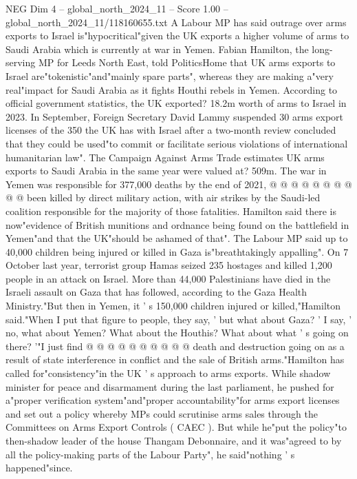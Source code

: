\begin{textsample}{NEG Dim 4 – global\_north\_2024\_11 – Score 1.00 – global\_north\_2024\_11/118160655.txt}  \label{ex:f4_neg_166}
A Labour MP has said outrage over arms exports to Israel is"hypocritical"given the UK exports a higher volume of arms to Saudi Arabia which is currently at war in Yemen.
Fabian Hamilton, the long-serving MP for Leeds North East, told PoliticsHome that UK arms exports to Israel are"tokenistic"and"mainly spare parts", whereas they are making a"very real"impact for Saudi Arabia as it fights Houthi rebels in Yemen.
According to official government statistics, the UK exported? 18.2m worth of arms to Israel in 2023.
In September, Foreign Secretary David Lammy suspended 30 arms export licenses of the 350 the UK has with Israel after a two-month review concluded that they could be used"to commit or facilitate serious violations of international humanitarian law".
The Campaign Against Arms Trade estimates UK arms exports to Saudi Arabia in the same year were valued at? 509m.
The war in Yemen was responsible for 377,000 deaths by the end of 2021, @ @ @ @ @ @ @ @ @ @ been killed by direct military action, with air strikes by the Saudi-led coalition responsible for the majority of those fatalities.
Hamilton said there is now"evidence of British munitions and ordnance being found on the battlefield in Yemen"and that the UK"should be ashamed of that".
The Labour MP said up to 40,000 children being injured or killed in Gaza is"breathtakingly appalling".
On 7 October last year, terrorist group Hamas seized 235 hostages and killed 1,200 people in an attack on Israel.
More than 44,000 Palestinians have died in the Israeli assault on Gaza that has followed, according to the Gaza Health Ministry."But then in Yemen, it ' s 150,000 children injured or killed,"Hamilton said."When I put that figure to people, they say, ' but what about Gaza? ' I say, ' no, what about Yemen?
What about the Houthis?
What about what ' s going on there? '"I just find @ @ @ @ @ @ @ @ @ @ death and destruction going on as a result of state interference in conflict and the sale of British arms."Hamilton has called for"consistency"in the UK ' s approach to arms exports.
While shadow minister for peace and disarmament during the last parliament, he pushed for a"proper verification system"and"proper accountability"for arms export licenses and set out a policy whereby MPs could scrutinise arms sales through the Committees on Arms Export Controls ( CAEC ).
But while he"put the policy"to then-shadow leader of the house Thangam Debonnaire, and it was"agreed to by all the policy-making parts of the Labour Party", he said"nothing ' s happened"since.

\end{textsample}

